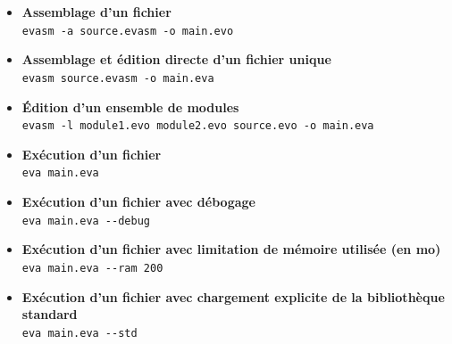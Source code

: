 \documentclass[11pt,twoside]{article}
\begin{document}
\begin{itemize}
  \item \textbf{Assemblage d'un fichier} \\
        \lstinline$evasm -a source.evasm -o main.evo$

  \item \textbf{Assemblage et édition directe d'un fichier unique} \\
        \lstinline$evasm source.evasm -o main.eva$

  \item \textbf{Édition d'un ensemble de modules} \\
        \lstinline$evasm -l module1.evo module2.evo source.evo -o main.eva$

  \item \textbf{Exécution d'un fichier} \\
        \lstinline$eva main.eva$

  \item \textbf{Exécution d'un fichier avec débogage} \\
        \lstinline$eva main.eva --debug$

  \item \textbf{Exécution d'un fichier avec limitation de mémoire utilisée (en mo)} \\
        \lstinline$eva main.eva --ram 200$

  \item \textbf{Exécution d'un fichier avec chargement explicite de la bibliothèque standard} \\
        \lstinline$eva main.eva --std$
\end{itemize}

\cleardoublepage


\end{document}
